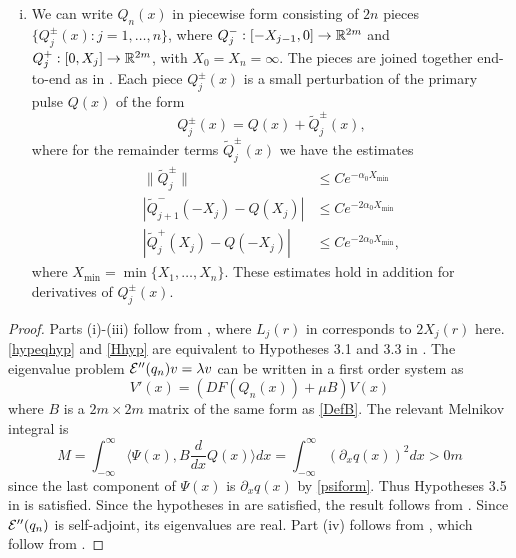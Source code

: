 \documentclass[thesis.tex]{subfiles}
\begin{document}
\begin{theorem}
\begin{enumerate}[(i)]
\item We can write $Q_n(x)$ in piecewise form consisting of $2n$ pieces $\{ Q_j^\pm(x) : j = 1, \dots, n \}$, where $Q_j^-: [-X_{j-1}, 0] \rightarrow \mathbb{R}^{2m}$ and $Q_j^+: [0, X_j] \rightarrow \mathbb{R}^{2m}$, with $X_0 = X_n = \infty$. The pieces are joined together end-to-end as in \cite{Sandstede1998}. Each piece $Q_j^\pm(x)$ is a small perturbation of the primary pulse $Q(x)$ of the form
\begin{equation}\label{Qpmexpansions}
Q_j^\pm(x) = Q(x) + \tilde{Q}_j^\pm(x),
\end{equation}
where for the remainder terms $\tilde{Q}_j^\pm(x)$ we have the estimates
\begin{equation}\label{Qpmestimates}
\begin{aligned}
\|\tilde{Q}_j^\pm\| &\leq C e^{-\alpha_0 X_{\min}} \\
|\tilde{Q}_{j+1}^-(-X_j) - Q(X_j)| &\leq C e^{-2 \alpha_0 X_{\min}} \\
|\tilde{Q}_j^+(X_j) - Q(-X_j)| &\leq C e^{-2 \alpha_0 X_{\min}},
\end{aligned}
\end{equation}
where $X_{\min} = \min\{X_1, \dots, X_n\}$. These estimates hold in addition for derivatives of $Q_j^\pm(x)$.
\end{enumerate}
\begin{proof}
Parts (i)-(iii) follow from \cite{SandstedeStrut}, where $L_j(r)$ in \cite{SandstedeStrut} corresponds to $2X_j(r)$ here. \cref{hypeqhyp} and \cref{Hhyp} are equivalent to Hypotheses 3.1 and 3.3 in \cite{SandstedeStrut}. The eigenvalue problem $\mathcal{E}''(q_n)v = \lambda v$ can be written in a first order system as
\[
V'(x) = (DF(Q_n(x)) + \mu B )V(x)
\]
where $B$ is a $2m\times 2m$ matrix of the same form as \cref{DefB}. The relevant Melnikov integral is
\[
M = \int_{-\infty}^\infty \langle \Psi(x), B \frac{d}{dx} Q(x) \rangle  dx = \int_{-\infty}^\infty (\partial_x q(x))^2 dx > 0m
\]
since the last component of $\Psi(x)$ is $\partial_x q(x)$ by \cref{psiform}. Thus Hypotheses 3.5 in \cite{SandstedeStrut} is satisfied. Since the hypotheses in \cite{SandstedeStrut} are satisfied, the result follows from \cite[Theorem 3.6]{SandstedeStrut}. Since $\mathcal{E}''(q_n)$ is self-adjoint, its eigenvalues are real. Part (iv) follows from \cite[Theorem 2]{Sandstede1998}, which follow from \cite{Sandstede1993}.
\end{proof}
\end{theorem}
\end{document}
